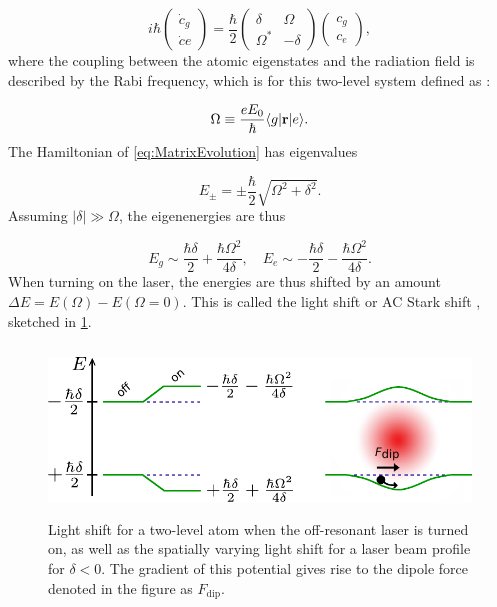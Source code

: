 \begin{equation}\label{eq:MatrixEvolution}
	i \hbar \begin{pmatrix}
		\dot{c}_g \\ 
		\dot{c}e
	\end{pmatrix}
	= \frac{\hbar}{2} \begin{pmatrix}
		\delta & \Omega \\ \Omega^* & -\delta 
	\end{pmatrix} 
	\begin{pmatrix}
		c_g \\ c_e
	\end{pmatrix},
\end{equation}
where the coupling between the atomic eigenstates and the radiation field is described by the Rabi frequency, which is for this two-level system defined as \cite{Metcalf1999}:

\begin{equation}\label{eq:RabiFrequencyMain}
	\Omega \equiv \frac{e E_0}{\hbar} \langle g\rvert\mathbf{r}\lvert e\rangle.
\end{equation}
The Hamiltonian of \cref{eq:MatrixEvolution} has eigenvalues 

\begin{equation}\label{eq:EigenValues}
	E_{\pm} = \pm
	\frac{\hbar}{2} \sqrt{\Omega^2+\delta^2}.
\end{equation}
Assuming $|\delta| \gg \Omega$, the eigenenergies are thus 

\begin{equation}\label{eq:SemiClassicalEigenvalues}
	E_g \sim  \frac{\hbar \delta}{2} +\frac{\hbar \Omega^2}{4 \delta}, \quad
	E_e \sim -\frac{\hbar \delta}{2} -\frac{\hbar \Omega^2}{4 \delta}.
\end{equation}
When turning on the laser, the energies are thus shifted by an amount $\Delta E = E(\Omega)-E(\Omega=0)$. 
This is called the light shift or AC Stark shift \cite{Metcalf1999}, sketched in \cref{fig:DipoleForce}.

\begin{figure}
    \centering
	\includegraphics[height=4.5cm]{figures/LightShift.pdf}
	\caption{Light shift for a two-level atom when the off-resonant laser is turned on, as well as the spatially varying light shift for a laser beam profile for $\delta<0$. 
	The gradient of this potential gives rise to the dipole force denoted in the figure as $F_{\text{dip}}$.}
	\label{fig:DipoleForce}
\end{figure}

